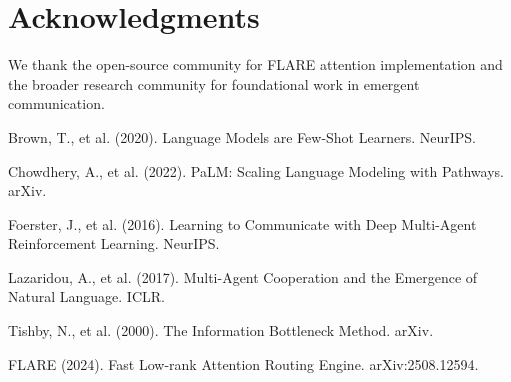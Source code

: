 \documentclass[10pt,twocolumn]{article}
\begin{document}
\section*{Acknowledgments}

We thank the open-source community for FLARE attention implementation and the broader research community for foundational work in emergent communication.


\begin{thebibliography}{99}

Brown, T., et al. (2020). Language Models are Few-Shot Learners. NeurIPS.

Chowdhery, A., et al. (2022). PaLM: Scaling Language Modeling with Pathways. arXiv.

Foerster, J., et al. (2016). Learning to Communicate with Deep Multi-Agent Reinforcement Learning. NeurIPS.

Lazaridou, A., et al. (2017). Multi-Agent Cooperation and the Emergence of Natural Language. ICLR.

Tishby, N., et al. (2000). The Information Bottleneck Method. arXiv.

FLARE (2024). Fast Low-rank Attention Routing Engine. arXiv:2508.12594.

\end{thebibliography}
\end{document}
